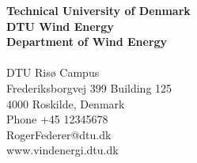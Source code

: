 \thispagestyle{empty} %
\frieze
\vspace*{\fill}
\noindent
\sffamily
\small
\textbf{Technical University of Denmark}\\
\textbf{DTU Wind Energy}\\
\textbf{Department of Wind Energy}\\
\\
DTU Ris{\o} Campus\\
Frederiksborgvej 399
Building 125\\
4000 Roskilde, Denmark\\
Phone +45 12345678\\
RogerFederer@dtu.dk\\
www.vindenergi.dtu.dk\\
\normalsize
\normalfont
\vspace*{2.5cm}
